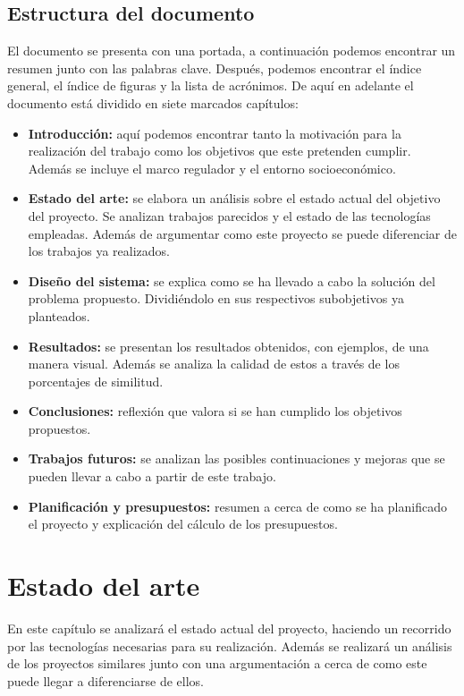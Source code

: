 \documentclass[12pt]{report} %
\begin{document}
	\section{Estructura del documento}
	El documento se presenta con una portada, a continuación podemos encontrar un resumen junto con las palabras clave. Después, podemos
	encontrar el índice general, el índice de figuras y la lista de acrónimos. De aquí en adelante el documento
	está dividido en siete marcados capítulos:
	\begin{itemize}
		\item \textbf{Introducción:} aquí podemos encontrar tanto la motivación para la realización del trabajo como los objetivos que este pretenden cumplir. Además se incluye el marco regulador y el entorno socioeconómico. 
		\item \textbf{Estado del arte:} se elabora un análisis sobre el estado actual del objetivo del proyecto. Se analizan trabajos parecidos y el estado de las tecnologías empleadas. Además de argumentar como este proyecto se puede diferenciar de los trabajos ya realizados.
		\item \textbf{Diseño del sistema:} se explica como se ha llevado a cabo la solución del problema propuesto. Dividiéndolo en sus respectivos subobjetivos ya planteados.
		\item \textbf{Resultados:} se presentan los resultados obtenidos, con ejemplos, de una manera visual. Además se analiza la calidad de estos a través de los porcentajes de similitud.
		\item \textbf{Conclusiones:} reflexión que valora si se han cumplido los objetivos propuestos.
		\item \textbf{Trabajos futuros:} se analizan las posibles continuaciones y mejoras que se pueden llevar a cabo a partir de este trabajo.
		\item \textbf{Planificación y presupuestos:} resumen a cerca de como se ha planificado el proyecto y explicación del cálculo de los presupuestos. 
	\end{itemize}


\chapter{Estado del arte}
	En este capítulo se analizará el estado actual del proyecto, haciendo un recorrido por las tecnologías necesarias para su realización.
	Además se realizará un análisis de los proyectos similares junto con una argumentación a cerca de como este puede llegar a diferenciarse de ellos.
\end{document}
